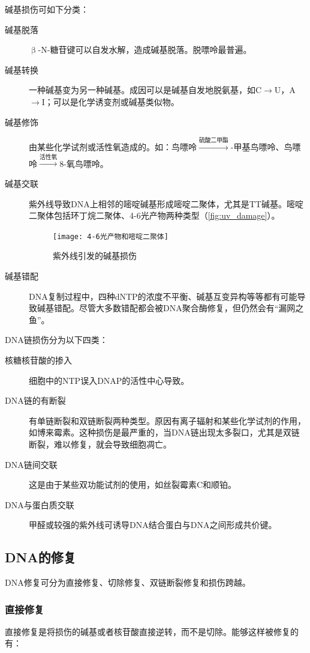 碱基损伤可如下分类：\begin{description}
	\item[碱基脱落] $\upbeta$-N-糖苷键可以自发水解，造成碱基脱落。脱嘌呤最普遍。
	\item[碱基转换] 一种碱基变为另一种碱基。成因可以是碱基自发地脱氨基，如C$\longrightarrow$U，A$\longrightarrow$I；可以是化学诱变剂或碱基类似物。
	\item[碱基修饰] 由某些化学试剂或活性氧造成的。如：鸟嘌呤$\xrightarrow{\text{硫酸二甲酯}}$-甲基鸟嘌呤、鸟嘌呤$\xrightarrow{\text{活性氧}}$8-氧鸟嘌呤。
	\item[碱基交联] 紫外线导致DNA上相邻的嘧啶碱基形成嘧啶二聚体，尤其是TT碱基。嘧啶二聚体包括环丁烷二聚体、4-6光产物两种类型（\autoref{fig:uv_damage}）。
	\begin{figure}[h!]
		\centering
		\texttt{[image: 4-6光产物和嘧啶二聚体]}
		\caption{紫外线引发的碱基损伤}
		\label{fig:uv_damage}
	\end{figure}
	\item[碱基错配] DNA复制过程中，四种dNTP的浓度不平衡、碱基互变异构等等都有可能导致碱基错配。尽管大多数错配都会被DNA聚合酶修复，但仍然会有“漏网之鱼”。
\end{description}

DNA链损伤分为以下四类：\begin{description}
	\item[核糖核苷酸的掺入] 细胞中的NTP误入DNAP的活性中心导致。
	\item[DNA链的有断裂] 有单链断裂和双链断裂两种类型。原因有离子辐射和某些化学试剂的作用，如博来霉素。这种损伤是最严重的，当DNA链出现太多裂口，尤其是双链断裂，难以修复，就会导致细胞凋亡。
	\item[DNA链间交联] 这是由于某些双功能试剂的使用，如丝裂霉素C和顺铂。
	\item[DNA与蛋白质交联] 甲醛或较强的紫外线可诱导DNA结合蛋白与DNA之间形成共价键。
\end{description}

\subsection{DNA的修复}

DNA修复可分为直接修复、切除修复、双链断裂修复和损伤跨越。

\subsubsection{直接修复}

直接修复是将损伤的碱基或者核苷酸直接逆转，而不是切除。能够这样被修复的有：


